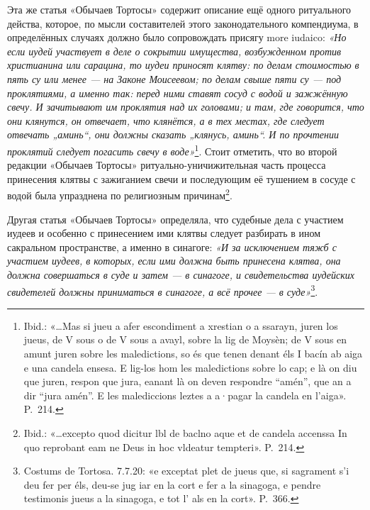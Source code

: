 Эта же статья «Обычаев Тортосы» содержит описание ещё одного ритуального действа, которое, по мысли составителей этого законодательного компендиума, в определённых случаях должно было сопровождать присягу more iudaico: \emph{«Но если иудей участвует в деле о сокрытии имущества, возбужденном против христианина или сарацина, то иудеи приносят клятву: по делам стоимостью в пять су или менее --- на Законе Моисеевом; по делам свыше пяти су --- под проклятиями, а именно так: перед ними ставят сосуд с водой и зажжённую свечу. И зачитывают им проклятия над их головами; и там, где говорится, что они клянутся, он отвечает, что клянётся, а в тех местах, где следует отвечать „аминь“, они должны сказать „клянусь, аминь“. И по прочтении проклятий следует }\emph{погасить свечу в воде»}\footnote{Ibid.: «…Mas si jueu a afer escondiment a xrestian o a ssarayn, juren los jueus, de V sous o de V sous a avayl, sobre la lig de Moysèn; de V sous en amunt juren sobre les maledictions, so és que tenen denant éls I bacín ab aiga e una candela ensesa. E lig-los hom les maledictions sobre lo cap; e là on diu que juren, respon que jura, eanant là on deven respondre “amén”, que an a dir “jura amén”. E les malediccions leztes a a·pagar la candela en l'aiga». P.~214.}. Стоит отметить, что во второй редакции «Обычаев Тортосы» ритуально-уничижительная часть процесса принесения клятвы с зажиганием свечи и последующим её тушением в сосуде с водой была упразднена по религиозным причинам\footnote{Ibid.: «…excepto quod dicitur lbl de baclno aque et de candela accenssa In quo reprobant eam ne Deus in hoc vldeatur tempteri». P.~214.}.

Другая статья «Обычаев Тортосы» определяла, что судебные дела с участием иудеев и особенно с принесением ими клятвы следует разбирать в ином сакральном пространстве, а именно в синагоге: \emph{«И за исключением тяжб с участием иудеев, в которых, если ими должна быть принесена клятва, она должна совершаться в суде и затем --- в синагоге, и свидетельства иудейских свидетелей должны приниматься в синагоге, а всё прочее --- в суде»}\footnote{Costums de Tortosa. 7.7.20: «e exceptat plet de jueus que, si sagrament s'i deu fer per éls, deu-se jug iar en la cort e fer a la sinagoga, e pendre testimonis jueus a la sinagoga, e tot l' als en la cort». P.~366.}.

